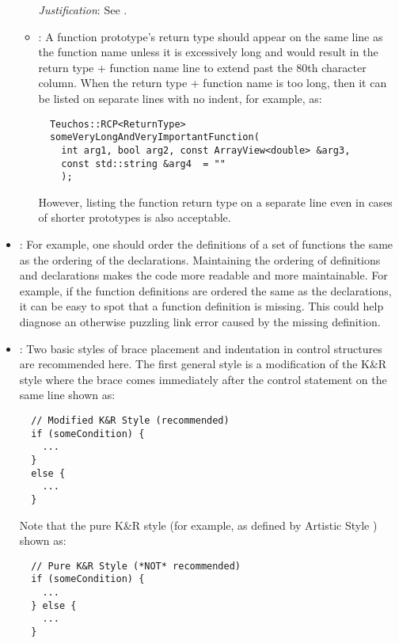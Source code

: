 \begin{itemize}
\begin{itemize}
  \textit{Justification}: See \cite[Section 31.1]{CodeComplete2nd04}.
  
  \item\FSCFunctionReturn: A function prototype's return type should appear
  on the same line as the function name unless it is excessively long and
  would result in the return type + function name line to extend past the 80th
  character column.  When the return type + function name is too long, then it
  can be listed on separate lines with no indent, for example, as:
  
  {\small\begin{verbatim}
  Teuchos::RCP<ReturnType>
  someVeryLongAndVeryImportantFunction(
    int arg1, bool arg2, const ArrayView<double> &arg3,
    const std::string &arg4  = ""
    );
  \end{verbatim}}

  However, listing the function return type on a separate line even in cases
  of shorter prototypes is also acceptable.

  \end{itemize}


\item\FSCOrderFunctionDefinitions: For example, one should order the
  definitions of a set of functions the same as the ordering of the
  declarations.  Maintaining the ordering of definitions and
  declarations makes the code more readable and more maintainable.
  For example, if the function definitions are ordered the same as the
  declarations, it can be easy to spot that a function definition is
  missing.  This could help diagnose an otherwise puzzling link error
  caused by the missing definition.

\item\FSCBracePlacement: Two basic styles of brace placement and
  indentation in control structures are recommended here.  The first
  general style is a modification of the K\&R style
  \cite{ArtisticStyle} where the brace comes immediately after the
  control statement on the same line shown as:

{\small\begin{verbatim}
  // Modified K&R Style (recommended)
  if (someCondition) {
    ...
  }
  else {
    ...
  }
\end{verbatim}}

Note that the pure K\&R style (for example, as defined by Artistic Style
\cite{ArtisticStyle}) shown as:

{\small\begin{verbatim}
  // Pure K&R Style (*NOT* recommended)
  if (someCondition) {
    ...
  } else {
    ...
  }
\end{verbatim}}


\end{itemize}
